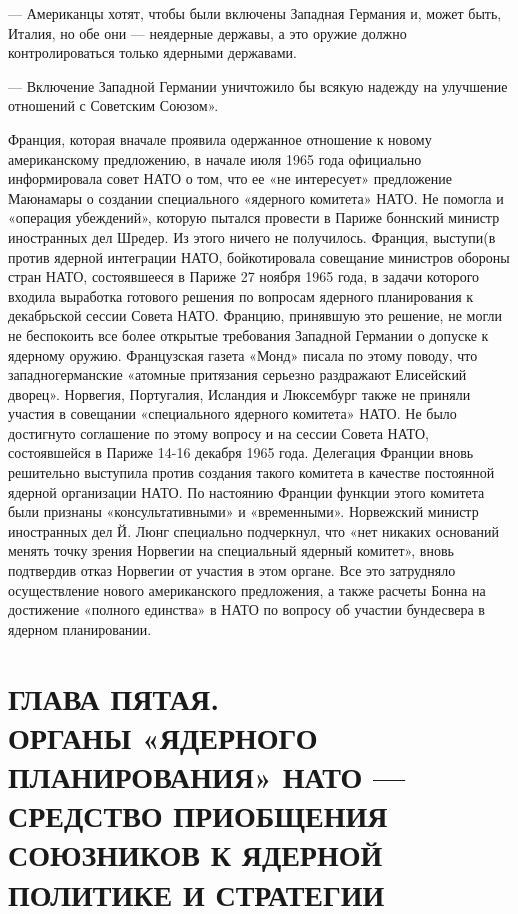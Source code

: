 \documentclass[12pt, a4paper, openany]{book}
\begin{document}
		— Американцы хотят, чтобы были включены Западная Германия и, может быть, Италия, но обе они — неядерные державы, а это оружие должно контролироваться только ядерными державами.
		
		— Включение Западной Германии уничтожило бы всякую надежду на улучшение отношений с Советским Союзом».
		
		Франция, которая вначале проявила одержанное отношение к новому американскому предложению, в начале июля 1965 года официально информировала совет НАТО о том, что ее «не интересует» предложение Маюнамары о создании специального «ядерного комитета» НАТО. Не помогла и «операция убеждений», которую пытался провести в Париже боннский министр иностранных дел Шредер. Из этого ничего не получилось. Франция, выступи(в против ядерной интеграции НАТО, бойкотировала совещание министров обороны стран НАТО, состоявшееся в Париже 27 ноября 1965 года, в задачи которого входила выработка готового решения по вопросам ядерного планирования к декабрьской сессии Совета НАТО. Францию, принявшую это решение, не могли не беспокоить все более открытые требования Западной Германии о допуске к ядерному оружию. Французская газета «Монд» писала по этому поводу, что западногерманские «атомные притязания серьезно раздражают Елисейский дворец». Норвегия, Португалия, Исландия и Люксембург также не приняли участия в совещании «специального ядерного комитета» НАТО. Не было достигнуто соглашение по этому вопросу и на сессии Совета НАТО, состоявшейся в Париже 14-16 декабря 1965 года. Делегация Франции вновь решительно выступила против создания такого комитета в качестве постоянной ядерной организации НАТО. По настоянию Франции функции этого комитета были признаны «консультативными» и «временными». Норвежский министр иностранных дел Й. Люнг специально подчеркнул, что «нет никаких оснований менять точку зрения Норвегии на специальный ядерный комитет», вновь подтвердив отказ Норвегии от участия в этом органе. Все это затрудняло осуществление нового американского предложения, а также расчеты Бонна на достижение «полного единства» в НАТО по вопросу об участии бундесвера в ядерном планировании.
		
				\newpage
		\section[Глава пятая. ОРГАНЫ «ЯДЕРНОГО ПЛАНИРОВАНИЯ» НАТО — СРЕДСТВО ПРИОБЩЕНИЯ СОЮЗНИКОВ К ЯДЕРНОЙ ПОЛИТИКЕ И СТРАТЕГИИ]{\center ГЛАВА ПЯТАЯ.\\ \textbf{ОРГАНЫ «ЯДЕРНОГО ПЛАНИРОВАНИЯ» НАТО — СРЕДСТВО ПРИОБЩЕНИЯ СОЮЗНИКОВ К ЯДЕРНОЙ ПОЛИТИКЕ И СТРАТЕГИИ
		}}	
\end{document}
